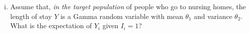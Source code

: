 \documentclass[letterpaper, 12pt]{article}
\newcommand{\pr}{\text{pr}}
\newcommand{\sbs}{\;|\;} %
\begin{document}
\begin{enumerate}[(i)]
\begin{proof}
\begin{align}
&= \int \frac{Y_i}{\alpha} f(Y_i, \theta) dY_i \\
&= \alpha^{-1}E[Y_i|\theta]
\\
&=\alpha^{-1}E[Y|\theta]
\label{denom}
\end{align}
Substituting \eqref{numer} and \eqref{denom} into \eqref{halfformed}
we have
\begin{align}
\pr(Y^{obs} \sbs I, \theta, \alpha) 
&= 
\frac{
\alpha^{-500}\left(\prod_{i = 1}^{500} f(Y_i,\theta) Y_i\right)
}
{\prod_{i=1}^{500}\alpha^{-1}E[Y|\theta]}
\\
&=
E[Y|\theta]^{-500}
\left(
\prod_{i=1}^{500}
f(Y_i,\theta) Y_i
\right)
\label{lik}
\end{align}
This is the likelihood equation we seek.
\end{proof}

\item
Assume that, \textit{in the target population} of people who go to nursing homes, 
the length of stay $Y$ is a Gamma random variable with mean $\theta_1$ and variance $\theta_2$. 
What is the expectation of $Y_i$ given $I_i = 1$?


\end{enumerate}
\end{document}

